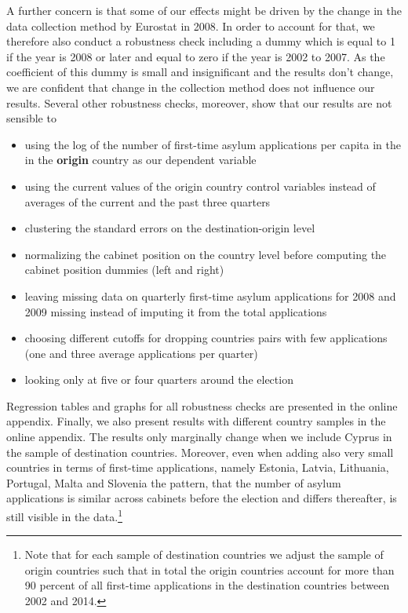\documentclass[a4paper,12pt]{article}
\begin{document}
A further concern is that some of our effects might be driven by the change in the data collection method by Eurostat in 2008. In order to account for that, we therefore also conduct a robustness check including a dummy which is equal to 1 if the year is 2008 or later and equal to zero if the year is 2002 to 2007. As the coefficient of this dummy is small and insignificant and the results don't change, we are confident that change in the collection method does not influence our results.  Several other robustness checks, moreover,  show that our results are not sensible to
\begin{itemize}
\itemsep0em 
\item  using the log of the number of first-time asylum applications per capita in the in the \textbf{origin} country as our dependent variable 
\item using  the current values of the origin country control variables instead of averages of the current and the past three quarters 
\item clustering the standard errors on the destination-origin level
\item normalizing the cabinet position on the country level before computing the cabinet position dummies (left and right)
\item leaving missing data on quarterly  first-time asylum applications for 2008 and 2009 missing instead of imputing it from the total applications
\item choosing  different cutoffs  for dropping countries pairs with few applications (one and three average applications per quarter)
\item looking only at five or four quarters around the election 
\end{itemize}
Regression tables and graphs for all robustness checks are presented in the online appendix. Finally, we also present results with different country samples in the online appendix. The results only marginally change when we include Cyprus in the sample of destination countries. Moreover, even when adding also very small countries in terms of first-time applications, namely Estonia, Latvia, Lithuania, Portugal, Malta and Slovenia the pattern, that the number of asylum applications is similar across cabinets before the election and differs thereafter, is still visible in the data.\footnote{Note that for each sample of destination countries we adjust the sample of origin countries such that in total the origin countries account for more than 90 percent of all first-time applications in the destination countries between 2002 and 2014.}  
\end{document}
